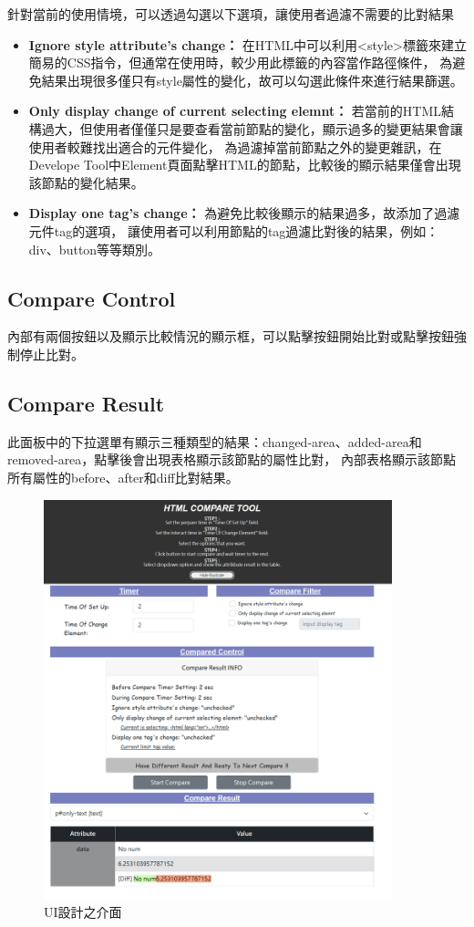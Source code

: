 針對當前的使用情境，可以透過勾選以下選項，讓使用者過濾不需要的比對結果

    \begin{itemize}
        \item\textbf{Ignore style attribute's change： }
        在HTML中可以利用<style>標籤來建立簡易的CSS指令，但通常在使用時，較少用此標籤的內容當作路徑條件，
        為避免結果出現很多僅只有style屬性的變化，故可以勾選此條件來進行結果篩選。

        \item\textbf{Only display change of current selecting elemnt： }
        若當前的HTML結構過大，但使用者僅僅只是要查看當前節點的變化，顯示過多的變更結果會讓使用者較難找出適合的元件變化，
        為過濾掉當前節點之外的變更雜訊，在Develope Tool中Element頁面點擊HTML的節點，比較後的顯示結果僅會出現該節點的變化結果。
        
        \item\textbf{Display one tag's change： }
        為避免比較後顯示的結果過多，故添加了過濾元件tag的選項，
        讓使用者可以利用節點的tag過濾比對後的結果，例如：div、button等等類別。

    \end{itemize}

\subsection{Compare Control}\label{s3.5.4}

內部有兩個按鈕以及顯示比較情況的顯示框，可以點擊按鈕開始比對或點擊按鈕強制停止比對。

\subsection{Compare Result}\label{s3.5.5}

此面板中的下拉選單有顯示三種類型的結果：changed-area、added-area和removed-area，點擊後會出現表格顯示該節點的屬性比對，
內部表格顯示該節點所有屬性的before、after和diff比對結果。

\indent

\begin{figure}[H]
    \centering
    \includegraphics[width=0.9\textwidth]{picture/ch3-UIUX-example.png}
    \caption{UI設計之介面}
    \label{f3.8}
\end{figure}
